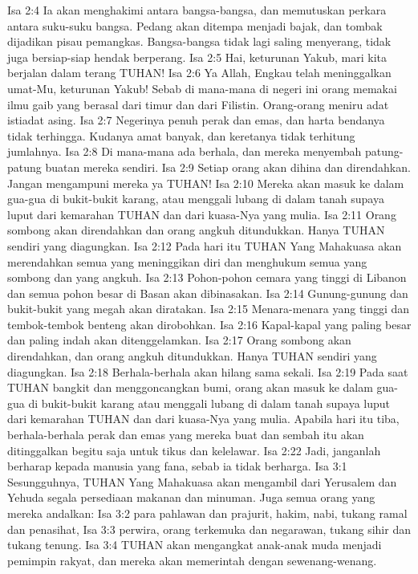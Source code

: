 Isa 2:4  Ia akan menghakimi antara bangsa-bangsa, dan memutuskan perkara antara suku-suku bangsa. Pedang akan ditempa menjadi bajak, dan tombak dijadikan pisau pemangkas. Bangsa-bangsa tidak lagi saling menyerang, tidak juga bersiap-siap hendak berperang.
Isa 2:5  Hai, keturunan Yakub, mari kita berjalan dalam terang TUHAN!
Isa 2:6  Ya Allah, Engkau telah meninggalkan umat-Mu, keturunan Yakub! Sebab di mana-mana di negeri ini orang memakai ilmu gaib yang berasal dari timur dan dari Filistin. Orang-orang meniru adat istiadat asing.
Isa 2:7  Negerinya penuh perak dan emas, dan harta bendanya tidak terhingga. Kudanya amat banyak, dan keretanya tidak terhitung jumlahnya.
Isa 2:8  Di mana-mana ada berhala, dan mereka menyembah patung-patung buatan mereka sendiri.
Isa 2:9  Setiap orang akan dihina dan direndahkan. Jangan mengampuni mereka ya TUHAN!
Isa 2:10  Mereka akan masuk ke dalam gua-gua di bukit-bukit karang, atau menggali lubang di dalam tanah supaya luput dari kemarahan TUHAN dan dari kuasa-Nya yang mulia.
Isa 2:11  Orang sombong akan direndahkan dan orang angkuh ditundukkan. Hanya TUHAN sendiri yang diagungkan.
Isa 2:12  Pada hari itu TUHAN Yang Mahakuasa akan merendahkan semua yang meninggikan diri dan menghukum semua yang sombong dan yang angkuh.
Isa 2:13  Pohon-pohon cemara yang tinggi di Libanon dan semua pohon besar di Basan akan dibinasakan.
Isa 2:14  Gunung-gunung dan bukit-bukit yang megah akan diratakan.
Isa 2:15  Menara-menara yang tinggi dan tembok-tembok benteng akan dirobohkan.
Isa 2:16  Kapal-kapal yang paling besar dan paling indah akan ditenggelamkan.
Isa 2:17  Orang sombong akan direndahkan, dan orang angkuh ditundukkan. Hanya TUHAN sendiri yang diagungkan.
Isa 2:18  Berhala-berhala akan hilang sama sekali.
Isa 2:19  Pada saat TUHAN bangkit dan menggoncangkan bumi, orang akan masuk ke dalam gua-gua di bukit-bukit karang atau menggali lubang di dalam tanah supaya luput dari kemarahan TUHAN dan dari kuasa-Nya yang mulia. Apabila hari itu tiba, berhala-berhala perak dan emas yang mereka buat dan sembah itu akan ditinggalkan begitu saja untuk tikus dan kelelawar.
Isa 2:22  Jadi, janganlah berharap kepada manusia yang fana, sebab ia tidak berharga.
Isa 3:1  Sesungguhnya, TUHAN Yang Mahakuasa akan mengambil dari Yerusalem dan Yehuda segala persediaan makanan dan minuman. Juga semua orang yang mereka andalkan:
Isa 3:2  para pahlawan dan prajurit, hakim, nabi, tukang ramal dan penasihat,
Isa 3:3  perwira, orang terkemuka dan negarawan, tukang sihir dan tukang tenung.
Isa 3:4  TUHAN akan mengangkat anak-anak muda menjadi pemimpin rakyat, dan mereka akan memerintah dengan sewenang-wenang.
